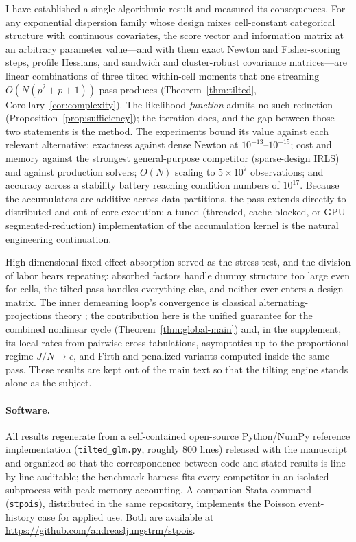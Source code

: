 \documentclass[11pt]{article}
\begin{document}
I have established a single algorithmic result and measured its
consequences.  For any exponential dispersion family whose design mixes
cell-constant categorical structure with continuous covariates, the
score vector and information matrix at an arbitrary parameter
value---and with them exact Newton and Fisher-scoring steps, profile
Hessians, and sandwich and cluster-robust covariance matrices---are
linear combinations of three tilted within-cell moments that one
streaming $O(N(p^2+p+1))$ pass produces
(Theorem~\ref{thm:tilted}, Corollary~\ref{cor:complexity}).  The
likelihood \emph{function} admits no such reduction
(Proposition~\ref{prop:sufficiency}); the iteration does, and the gap
between those two statements is the method.  The experiments bound its
value against each relevant alternative: exactness against dense Newton
at $10^{-13}$--$10^{-15}$; cost and memory against the strongest
general-purpose competitor (sparse-design IRLS) and against production
solvers; $O(N)$ scaling to $5\times10^7$ observations; and accuracy
across a stability battery reaching condition numbers of $10^{17}$.
Because the accumulators are additive across data partitions, the pass
extends directly to distributed and out-of-core execution; a tuned
(threaded, cache-blocked, or GPU segmented-reduction) implementation of
the accumulation kernel is the natural engineering continuation.

High-dimensional fixed-effect absorption served as the stress test, and
the division of labor bears repeating: absorbed factors handle dummy
structure too large even for cells, the tilted pass handles everything
else, and neither ever enters a design matrix.  The inner demeaning
loop's convergence is classical alternating-projections theory
\citep{vonneumann1950,halperin1962,gaure2013}; the contribution here is
the unified guarantee for the combined nonlinear cycle
(Theorem~\ref{thm:global-main}) and, in the supplement, its local rates
from pairwise cross-tabulations, asymptotics up to the proportional
regime $J/N \to c$, and Firth and penalized variants computed inside
the same pass.  These results are kept out of the main text so that the
tilting engine stands alone as the subject.

\paragraph{Software.}  All results regenerate from a self-contained
open-source Python/NumPy reference implementation
(\texttt{tilted\_glm.py}, roughly $800$ lines) released with the
manuscript and organized so that the correspondence between code and
stated results is line-by-line auditable; the benchmark harness fits
every competitor in an isolated subprocess with peak-memory accounting.
A companion Stata command (\texttt{stpois}), distributed in the same
repository, implements the Poisson event-history case for applied use.
Both are available at \url{https://github.com/andreasljungstrm/stpois}.
\end{document}
